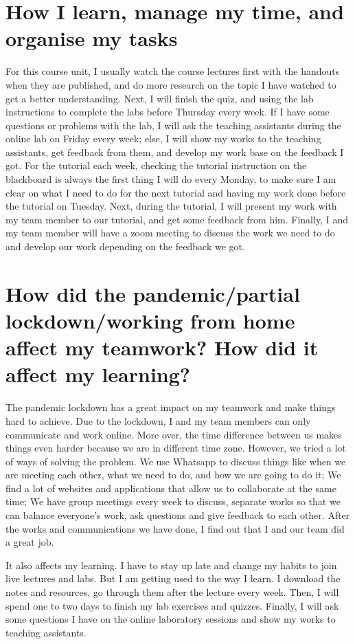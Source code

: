 \documentclass[a4paper]{article}
\begin{document}
\section{How I learn, manage my time, and organise my tasks}
For this course unit, I usually watch the course lectures first with the handouts when they are published, and do more research on the topic I have watched to get a better understanding. Next, I will finish the quiz, and using the lab instructions to complete the labs before Thursday every week. If I have some questions or problems with the lab, I will ask the teaching assistants during the online lab on Friday every week; else, I will show my works to the teaching assistants, get feedback from them, and develop my work base on the feedback I got. 
For the tutorial each week, checking the tutorial instruction on the blackboard is always the first thing I will do every Monday, to make sure I am clear on what I need to do for the next tutorial and having my work done before the tutorial on Tuesday. Next, during the tutorial, I will present my work with my team member to our tutorial, and get some feedback from him. Finally, I and my team member will have a zoom meeting to discuss the work we need to do and develop our work depending on the feedback we got.

\section{How did the pandemic/partial lockdown/working from home affect my teamwork? How did it affect my learning?}
The pandemic lockdown has a great impact on my teamwork and make things hard to achieve. Due to the lockdown, I and my team members can only communicate and work online. More over, the time difference between us makes things even harder because we are in different time zone. However, we tried a lot of ways of solving the problem. We use Whatsapp to discuss things like when we are meeting each other, what we need to do, and how we are going to do it; We find a lot of websites and applications that allow us to collaborate at the same time; We have group meetings every week to discuss, separate works so that we can balance everyone’s work, ask questions and give feedback to each other. After the works and communications we have done, I find out that I and our team did a great job.

It also affects my learning. I have to stay up late and change my habits to join live lectures and labs. But I am getting used to the way I learn. I download the notes and resources, go through them after the lecture every week. Then, I will spend one to two days to finish my lab exercises and quizzes. Finally, I will ask some questions I have on the online laboratory sessions and show my works to teaching assistants.
\end{document}
